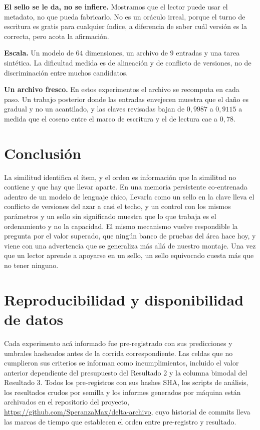 \documentclass[11pt,a4paper]{article}
\begin{document}
\textbf{El sello se le da, no se infiere.} Mostramos que el lector puede usar el metadato, no que pueda
fabricarlo. No es un oráculo irreal, porque el turno de escritura es gratis para cualquier índice, a
diferencia de saber cuál versión es la correcta, pero acota la afirmación.

\textbf{Escala.} Un modelo de $64$ dimensiones, un archivo de $9$ entradas y una tarea sintética. La
dificultad medida es de alineación y de conflicto de versiones, no de discriminación entre muchos
candidatos.

\textbf{Un archivo fresco.} En estos experimentos el archivo se recomputa en cada paso. Un trabajo
posterior donde las entradas envejecen muestra que el daño es gradual y no un acantilado, y las claves
revisadas bajan de $0{,}9987$ a $0{,}9115$ a medida que el coseno entre el marco de escritura y el de
lectura cae a $0{,}78$.

\section{Conclusión}

La similitud identifica el ítem, y el orden es información que la similitud no contiene y que hay que
llevar aparte. En una memoria persistente co-entrenada adentro de un modelo de lenguaje chico,
llevarla como un sello en la clave lleva el conflicto de versiones del azar a casi el techo, y un
control con los mismos parámetros y un sello sin significado muestra que lo que trabaja es el
ordenamiento y no la capacidad. El mismo mecanismo vuelve respondible la pregunta por el valor
superado, que ningún banco de pruebas del área hace hoy, y viene con una advertencia que se generaliza
más allá de nuestro montaje. Una vez que un lector aprende a apoyarse en un sello, un sello equivocado
cuesta más que no tener ninguno.

\section*{Reproducibilidad y disponibilidad de datos}

Cada experimento acá informado fue pre-registrado con sus predicciones y umbrales hasheados antes de la
corrida correspondiente. Las celdas que no cumplieron sus criterios se informan como incumplimientos,
incluido el valor anterior dependiente del presupuesto del Resultado 2 y la columna bimodal del
Resultado 3. Todos los pre-registros con sus hashes SHA, los scripts de análisis, los resultados crudos
por semilla y los informes generados por máquina están archivados en el repositorio del proyecto,
\url{https://github.com/SperanzaMax/delta-archivo}, cuyo historial de commits lleva las marcas de
tiempo que establecen el orden entre pre-registro y resultado.
\end{document}
